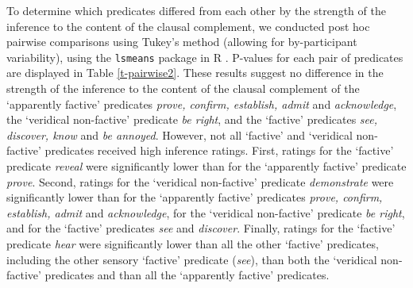 \documentclass[11pt,fleqn]{article}
\newcommand{\6}{\mbox{$[\hspace*{-.6mm}[$}}
\newcommand{\9}{\mbox{$]\hspace*{-.6mm}]$}}
\begin{document}
To determine which predicates differed from each other by the strength of the inference to the content of the clausal complement, we conducted post hoc pairwise comparisons using Tukey's method (allowing for by-participant variability), using the \verb|lsmeans| package \citep{tukey} in R \citep{r}. P-values for each pair of predicates are displayed in Table \ref{t-pairwise2}. These results suggest no difference in the strength of the inference to the content of the clausal complement of the `apparently factive' predicates {\em prove, confirm, establish, admit} and {\em acknowledge}, the `veridical non-factive' predicate {\em be right}, and the `factive' predicates {\em see, discover, know} and {\em be annoyed}. However, not all `factive' and `veridical non-factive' predicates received high inference ratings. First, ratings for the `factive' predicate {\em reveal} were significantly lower than for the `apparently factive' predicate {\em prove}. Second, ratings for the `veridical non-factive' predicate {\em demonstrate} were significantly lower than for the `apparently factive' predicates {\em prove, confirm, establish, admit} and {\em acknowledge}, for the `veridical non-factive' predicate {\em be right}, and for the `factive' predicates {\em see} and {\em discover}. Finally, ratings for the `factive' predicate {\em hear} were significantly lower than all the other `factive' predicates, including the other sensory `factive' predicate ({\em see}), than both the `veridical non-factive' predicates and than all the `apparently factive' predicates. 
\end{document}
